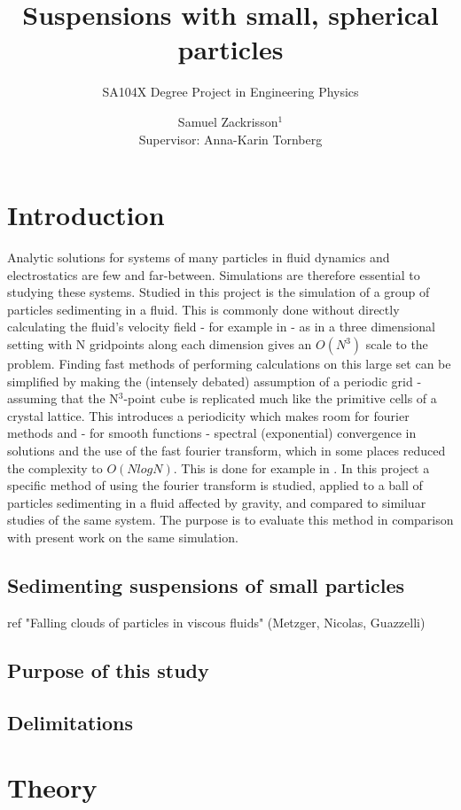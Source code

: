 \documentclass[a4paper,twoside=false,abstract=false,numbers=noenddot,
titlepage=false,headings=small,parskip=half,version=last]{scrartcl}
\title{Suspensions with small, spherical particles}
\subtitle{SA104X Degree Project in Engineering Physics}
\author[2]{Samuel Zackrisson$^1$ \\ \footnotesize Supervisor: Anna-Karin Tornberg}
\affil[1,2]{Department for Numerical Analysis, Royal Institute of Technology}
\affil[1]{samuelz@kth.se}
\affil[2]{akto@kth.se}
\begin{document}
\maketitle
\thispagestyle{empty}

\tableofcontents

\section{Introduction}
Analytic solutions for systems of many particles in fluid dynamics and electrostatics are few and far-between. Simulations are therefore essential to studying these systems. Studied in this project is the simulation of a group of particles sedimenting in a fluid. This is commonly done without directly calculating the fluid's velocity field - for example in \cite{fallingclouds} - as in a three dimensional setting with N gridpoints along each dimension gives an $O(N^3)$ scale to the problem. Finding fast methods of performing calculations on this large set can be simplified by making the (intensely debated) assumption of a periodic grid - assuming that the N$^3$-point cube is replicated much like the primitive cells of a crystal lattice. This introduces a periodicity which makes room for fourier methods and - for smooth functions - spectral (exponential) convergence in solutions and the use of the fast fourier transform, which in some places reduced the complexity to $O(NlogN)$. This is done for example in \cite{fluctuatesediment}. In this project a specific method of using the fourier transform is studied, applied to a ball of particles sedimenting in a fluid affected by gravity, and compared to similuar studies of the same system. The purpose is to evaluate this method in comparison with present work on the same simulation.
\subsection{Sedimenting suspensions of small particles}
ref "Falling clouds of particles in viscous fluids" (Metzger, Nicolas, Guazzelli)
\subsection{Purpose of this study}
\subsection{Delimitations}

\section{Theory}
\end{document}
